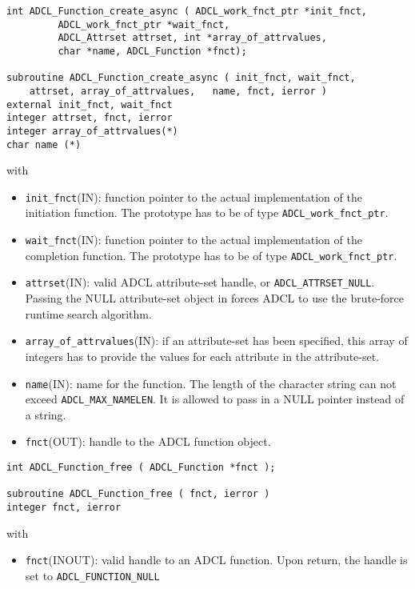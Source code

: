\hspace{1cm}
\begin{verbatim}
int ADCL_Function_create_async ( ADCL_work_fnct_ptr *init_fnct, 
         ADCL_work_fnct_ptr *wait_fnct, 
         ADCL_Attrset attrset, int *array_of_attrvalues, 
         char *name, ADCL_Function *fnct);

subroutine ADCL_Function_create_async ( init_fnct, wait_fnct, 
    attrset, array_of_attrvalues, 	name, fnct, ierror )
external init_fnct, wait_fnct
integer attrset, fnct, ierror
integer array_of_attrvalues(*)
char name (*)	  
\end{verbatim}
with
\begin{itemize}
\item {\tt init\_fnct}(IN): function pointer to the actual implementation of the initiation function. The prototype has
     to be of type {\tt ADCL\_work\_fnct\_ptr}.
\item {\tt wait\_fnct}(IN): function pointer to the actual implementation of the completion function. The prototype has
     to be of type {\tt ADCL\_work\_fnct\_ptr}.
\item {\tt attrset}(IN): valid ADCL attribute-set handle, or {\tt ADCL\_ATTRSET\_NULL}. Passing the NULL attribute-set 
   object in forces ADCL to use the brute-force runtime search algorithm.
\item {\tt array\_of\_attrvalues}(IN): if an attribute-set has been specified, this array of
 integers has to provide the values for each attribute in the attribute-set. 
\item {\tt name}(IN): name for the function. The length of the character string can not exceed 
  {\tt ADCL\_MAX\_NAMELEN}. It is allowed to pass in a NULL pointer instead of a string.
\item {\tt fnct}(OUT): handle to the ADCL function object.
\end{itemize}


\hspace{1cm}
\begin{verbatim}
int ADCL_Function_free ( ADCL_Function *fnct );

subroutine ADCL_Function_free ( fnct, ierror )
integer fnct, ierror
\end{verbatim}
with
\begin{itemize}
\item {\tt fnct}(INOUT): valid handle to an ADCL function. Upon return, the handle is set to {\tt ADCL\_FUNCTION\_NULL}
\end{itemize}

